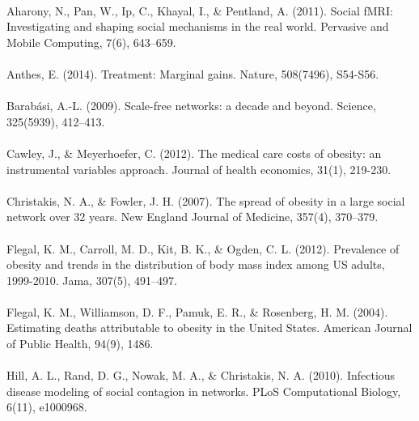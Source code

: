 \documentclass[11pt]{article}
\begin{document}
\paragraph{}
Aharony, N., Pan, W., Ip, C., Khayal, I., \& Pentland, A. (2011). Social fMRI: Investigating and shaping social mechanisms in the real world. Pervasive and Mobile Computing, 7(6), 643–659.
\paragraph{}
Anthes, E. (2014). Treatment: Marginal gains. Nature, 508(7496), S54-S56.
\paragraph{}
Barabási, A.-L. (2009). Scale-free networks: a decade and beyond. Science, 325(5939), 412–413.
\paragraph{}
Cawley, J., \& Meyerhoefer, C. (2012). The medical care costs of obesity: an instrumental variables approach. Journal of health economics, 31(1), 219-230.
\paragraph{}
Christakis, N. A., \& Fowler, J. H. (2007). The spread of obesity in a large social network over 32 years. New England Journal of Medicine, 357(4), 370–379.
\paragraph{}
Flegal, K. M., Carroll, M. D., Kit, B. K., \& Ogden, C. L. (2012). Prevalence of obesity and trends in the distribution of body mass index among US adults, 1999-2010. Jama, 307(5), 491–497.
\paragraph{}
Flegal, K. M., Williamson, D. F., Pamuk, E. R., \& Rosenberg, H. M. (2004). Estimating deaths attributable to obesity in the United States. American Journal of Public Health, 94(9), 1486.
\paragraph{}
Hill, A. L., Rand, D. G., Nowak, M. A., \& Christakis, N. A. (2010). Infectious disease modeling of social contagion in networks. PLoS Computational Biology, 6(11), e1000968.
\end{document}
